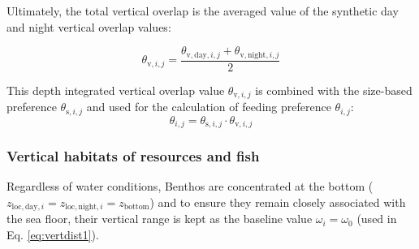 \documentclass[
]{article}
\begin{document}
Ultimately, the total vertical overlap is the averaged value of the
synthetic day and night vertical overlap values:

\begin{equation}
  \theta_{\mathrm{v},i,j} = \frac{\theta_{\mathrm{v},\mathrm{day},i,j}+\theta_{\mathrm{v},\mathrm{night},i,j}}{2}
  \label{eq:vertover}
\end{equation}

This depth integrated vertical overlap value \(\theta_{\mathrm{v},i,j}\)
is combined with the size-based preference \(\theta_{\mathrm{s},i,j}\)
and used for the calculation of feeding preference \(\theta_{i,j}\):
\begin{equation}
\theta_{i,j} = \theta_{\mathrm{s},i,j} \cdot\theta_{\mathrm{v},i,j} 
\label{eq:verttheta}
\end{equation}

\hypertarget{vertical-habitats-of-resources-and-fish}{%
\subsubsection{Vertical habitats of resources and
fish}\label{vertical-habitats-of-resources-and-fish}}

Regardless of water conditions, Benthos are concentrated at the bottom
(\(z_{\mathrm{loc},\mathrm{day},i} = z_{\mathrm{loc},\mathrm{night},i} = z_{\mathrm{bottom}}\))
and to ensure they remain closely associated with the sea floor, their
vertical range is kept as the baseline value \(\omega_i=\omega_0\) (used
in Eq. \ref{eq:vertdist1}).
\end{document}
